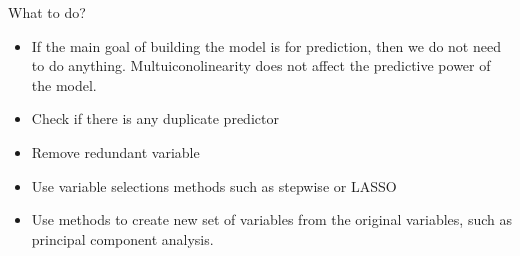 \documentclass[
  ignorenonframetext,
]{beamer}
\begin{document}
\begin{frame}{What to do?}
\protect\hypertarget{what-to-do}{}
\begin{itemize}
\item
  If the main goal of building the model is for prediction, then we do
  not need to do anything. Multuiconolinearity does not affect the
  predictive power of the model.
\item
  Check if there is any duplicate predictor
\item
  Remove redundant variable
\item
  Use variable selections methods such as stepwise or LASSO
\item
  Use methods to create new set of variables from the original
  variables, such as principal component analysis.
\end{itemize}
\end{frame}
\end{document}

